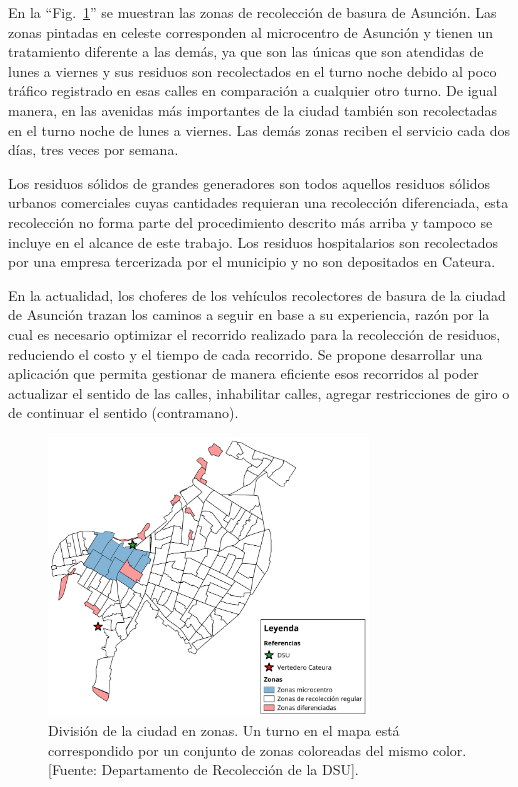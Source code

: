 \documentclass[spanish, conference]{IEEEtran}
\begin{document}
En la ``Fig.~\ref{fig:zonasRecoleccion}'' se muestran las zonas de recolección de basura de Asunción. Las zonas pintadas en celeste corresponden al microcentro de Asunción y tienen un tratamiento diferente a las demás, ya que son las únicas que son atendidas de lunes a viernes y sus residuos son recolectados en el turno noche debido al poco tráfico registrado en esas calles en comparación a cualquier otro turno. De igual manera, en las avenidas más importantes de la ciudad también son recolectadas en el turno noche de lunes a viernes. Las demás zonas reciben el servicio cada dos días, tres veces por semana.

Los residuos sólidos de grandes generadores son todos aquellos residuos sólidos urbanos comerciales cuyas cantidades requieran una recolección diferenciada, esta recolección no forma parte del procedimiento descrito más arriba y tampoco se incluye en el alcance de este trabajo. Los residuos hospitalarios son recolectados por una empresa tercerizada por el municipio y no son depositados en Cateura.

En la actualidad, los choferes de los vehículos recolectores de basura de la ciudad de Asunción trazan los caminos a seguir en base a su experiencia, razón por la cual es necesario optimizar el recorrido realizado para la recolección de residuos, reduciendo el costo y el tiempo de cada recorrido. Se propone desarrollar una aplicación que permita gestionar de manera eficiente esos recorridos al poder actualizar el sentido de las calles, inhabilitar calles, agregar restricciones de giro o de continuar el sentido (contramano).

\begin{figure}[tbp]
\centerline{\includegraphics[width=8.5cm]{imagenes/Recoleccion-ZONAS_CUADRANTES.png}}
\caption{División de la ciudad en zonas. Un turno en el mapa está correspondido por un conjunto de zonas coloreadas del mismo color. [Fuente: Departamento de Recolección de la DSU].}
\label{fig:zonasRecoleccion}
\end{figure}
\end{document}

